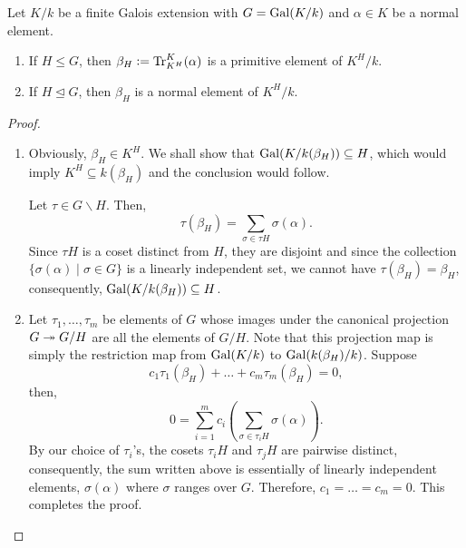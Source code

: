 \begin{theorem}
    Let $K/k$ be a finite Galois extension with $G = \operatorname{Gal}(K/k)$ and $\alpha\in K$ be a normal element.
    \begin{enumerate}[label=(\alph*)]
        \item If $H\le G$, then $\beta_H := \operatorname{Tr}^K_{K^H}(\alpha)$ is a primitive element of $K^H/k$. 
        \item If $H\unlhd G$, then $\beta_H$ is a normal element of $K^H/k$.
    \end{enumerate}
\end{theorem}
\begin{proof}
\begin{enumerate}[label=(\alph*)]
    \item Obviously, $\beta_H\in K^H$. We shall show that $\operatorname{Gal}(K/k(\beta_H))\subseteq H$, which would imply $K^H\subseteq k(\beta_H)$ and the conclusion would follow.

    Let $\tau\in G\backslash H$. Then, 
    \begin{equation*}
        \tau(\beta_H) = \sum_{\sigma\in \tau H}\sigma(\alpha).
    \end{equation*}
    Since $\tau H$ is a coset distinct from $H$, they are disjoint and since the collection $\{\sigma(\alpha)\mid\sigma\in G\}$ is a linearly independent set, we cannot have $\tau(\beta_H) = \beta_H$, consequently, $\operatorname{Gal}(K/k(\beta_H))\subseteq H$.

    \item Let $\tau_1,\dots,\tau_m$ be elements of $G$ whose images under the canonical projection $G\twoheadrightarrow G/H$ are all the elements of $G/H$. Note that this projection map is simply the restriction map from $\operatorname{Gal}(K/k)$ to $\operatorname{Gal}(k(\beta_H)/k)$. Suppose 
    \begin{equation*}
        c_1\tau_1(\beta_H) + \dots + c_m\tau_m(\beta_H) = 0,
    \end{equation*}
    then, 
    \begin{equation*}
        0 = \sum_{i = 1}^mc_i\left(\sum_{\sigma\in \tau_i H}\sigma(\alpha)\right).
    \end{equation*}
    By our choice of $\tau_i$'s, the cosets $\tau_i H$ and $\tau_j H$ are pairwise distinct, consequently, the sum written above is essentially of linearly independent elements, $\sigma(\alpha)$ where $\sigma$ ranges over $G$. Therefore, $c_1 = \dots = c_m = 0$. This completes the proof.\qedhere
\end{enumerate}
\end{proof}